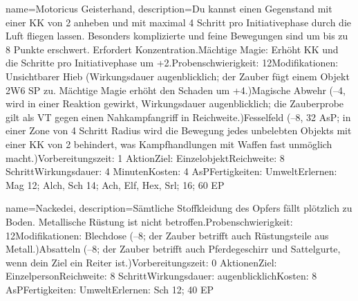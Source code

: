 {
    name={Motoricus Geisterhand},
    description={Du kannst einen Gegenstand mit einer KK von 2 anheben und mit maximal 4 Schritt pro Initiativephase durch die Luft fliegen lassen. Besonders komplizierte und feine Bewegungen sind um bis zu 8 Punkte erschwert. Erfordert Konzentration.\newline Mächtige Magie: Erhöht KK und die Schritte pro Initiativephase um +2.\newline Probenschwierigkeit: 12\newline Modifikationen: Unsichtbarer Hieb (Wirkungsdauer augenblicklich; der Zauber fügt einem Objekt 2W6 SP zu. Mächtige Magie erhöht den Schaden um +4.)\newline Magische Abwehr (–4, wird in einer Reaktion gewirkt, Wirkungsdauer augenblicklich; die Zauberprobe gilt als VT gegen einen Nahkampfangriff in Reichweite.)\newline Fesselfeld (–8, 32 AsP; in einer Zone von 4 Schritt Radius wird die Bewegung jedes unbelebten Objekts mit einer KK von 2 behindert, was Kampfhandlungen mit Waffen fast unmöglich macht.)\newline Vorbereitungszeit: 1 Aktion\newline Ziel: Einzelobjekt\newline Reichweite: 8 Schritt\newline Wirkungsdauer: 4 Minuten\newline Kosten: 4 AsP\newline Fertigkeiten: Umwelt\newline Erlernen: Mag 12; Alch, Sch 14; Ach, Elf, Hex, Srl; 16; 60 EP}
}


{
    name={Nackedei},
    description={Sämtliche Stoffkleidung des Opfers fällt plötzlich zu Boden. Metallische Rüstung ist nicht betroffen.\newline Probenschwierigkeit: 12\newline Modifikationen: Blechdose (–8; der Zauber betrifft auch Rüstungsteile aus Metall.)\newline Absatteln (–8; der Zauber betrifft auch Pferdegeschirr und Sattelgurte, wenn dein Ziel ein Reiter ist.)\newline Vorbereitungszeit: 0 Aktionen\newline Ziel: Einzelperson\newline Reichweite: 8 Schritt\newline Wirkungsdauer: augenblicklich\newline Kosten: 8 AsP\newline Fertigkeiten: Umwelt\newline Erlernen: Sch 12; 40 EP}
}


